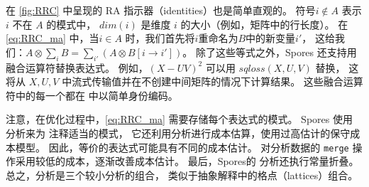 在 \autoref{fig:RRC} 中呈现的 RA 指示器（identities）也是简单直观的。 %
符号$i \not\in A$ 表示 $i$ 不在 $A$ 的模式中，
  $dim(i)$ 是维度 $i$ 的大小（例如，矩阵中的行长度）。
在\autoref{eq:RRC_ma} 中，当$i \in A$ 时，我们首先将$i$重命名为$B$中的新变量$i'$，
  这给我们：$A \otimes \sum_i B = \sum_{i'} (A \otimes B[i \rightarrow i'])$。
除了这些等式之外，Spores 还支持用融合运算符替换表达式。
例如，$(X-UV)^2$ 可以用 $sqloss(X, U, V)$ 替换，
这将从 $X, U, V$ 中流式传输值并在不创建中间矩阵的情况下计算结果。
这些融合运算符中的每一个都在 \Egg 中以简单身份编码。

注意，在优化过程中，\autoref{eq:RRC_ma} 需要存储每个表达式的模式。
Spores 使用 \eclass 分析来为 \eclasses 注释适当的模式，
  它还利用\eclass 分析进行成本估算，使用过高估计的保守成本模型。
因此，等价的表达式可能具有不同的成本估计。
  对分析数据的 \texttt{merge} 操作采用较低的成本，逐渐改善成本估计。
最后，Spores的 \eclass 分析还执行常量折叠。
总之，\eclass 分析是三个较小分析的组合，
  类似于抽象解释中的格点（lattices）组合。%

